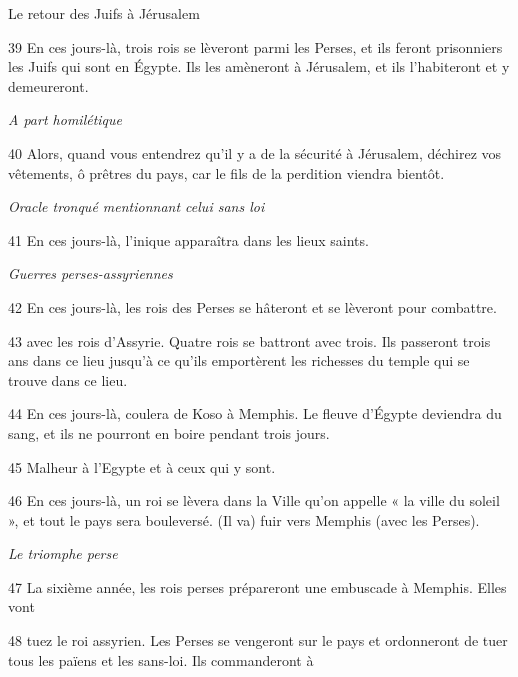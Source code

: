 \par Le retour des Juifs à Jérusalem

\par 39 En ces jours-là, trois rois se lèveront parmi les Perses, et ils feront prisonniers les Juifs qui sont en Égypte. Ils les amèneront à Jérusalem, et ils l'habiteront et y demeureront.

\par \textit{A part homilétique}

\par 40 Alors, quand vous entendrez qu'il y a de la sécurité à Jérusalem, déchirez vos vêtements, ô prêtres du pays, car le fils de la perdition viendra bientôt.

\par \textit{Oracle tronqué mentionnant celui sans loi}

\par 41 En ces jours-là, l'inique apparaîtra dans les lieux saints.

\par \textit{Guerres perses-assyriennes}

\par 42 En ces jours-là, les rois des Perses se hâteront et se lèveront pour combattre.

\par 43 avec les rois d'Assyrie. Quatre rois se battront avec trois. Ils passeront trois ans dans ce lieu jusqu'à ce qu'ils emportèrent les richesses du temple qui se trouve dans ce lieu.

\par 44 En ces jours-là, coulera de Koso à Memphis. Le fleuve d'Égypte deviendra du sang, et ils ne pourront en boire pendant trois jours.

\par 45 Malheur à l'Egypte et à ceux qui y sont.

\par 46 En ces jours-là, un roi se lèvera dans la Ville qu'on appelle « la ville du soleil », et tout le pays sera bouleversé. (Il va) fuir vers Memphis (avec les Perses).

\par \textit{Le triomphe perse}

\par 47 La sixième année, les rois perses prépareront une embuscade à Memphis. Elles vont

\par 48 tuez le roi assyrien. Les Perses se vengeront sur le pays et ordonneront de tuer tous les païens et les sans-loi. Ils commanderont à

